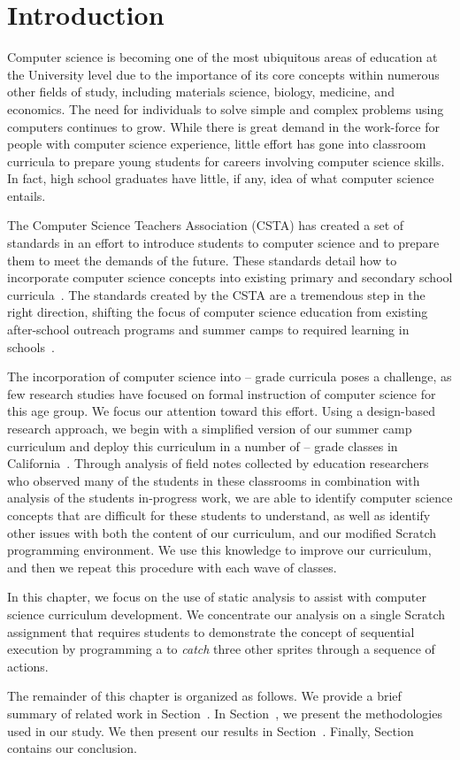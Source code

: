 \section{Introduction}
Computer science is becoming one of the most ubiquitous areas of education at
the University level due to the importance of its core concepts within numerous
other fields of study, including materials science, biology, medicine, and
economics. The need for individuals to solve simple and complex problems using
computers continues to grow. While there is great demand in the work-force for
people with computer science experience, little effort has gone into classroom
curricula to prepare young students for careers involving computer science
skills. In fact, high school graduates have little, if any, idea of what
computer science entails.

The Computer Science Teachers Association (CSTA) has created a set of standards
in an effort to introduce students to computer science and to prepare them to
meet the demands of the future. These standards detail how to incorporate
computer science concepts into existing primary and secondary school
curricula~\cite{cstastandards}. The standards created by the CSTA are a
tremendous step in the right direction, shifting the focus of computer science
education from existing after-school outreach programs and summer camps to
required learning in schools~\cite{wayanoutpost, georgiaoutreach,
  Franklin:2011:ATA:1953163.1953295, Maloney:2010:SPL:1868358.1868363,
  Dann:2000:MCP:343048.343070, Hood:2005:TPL:1067445.1067454, csunplugged}.

The incorporation of computer science into -- grade curricula
poses a challenge, as few research studies have focused on formal instruction
of computer science for this age group. We focus our attention toward this
effort. Using a design-based research approach, we begin with a simplified
version of our summer camp curriculum and deploy this curriculum in a number of
-- grade classes in California~\cite{Franklin:2013:SBO}. Through
analysis of field notes collected by education researchers who observed many of
the students in these classrooms in combination with analysis of the students
in-progress work, we are able to identify computer science concepts that are
difficult for these students to understand, as well as identify other issues
with both the content of our curriculum, and our modified Scratch programming
environment. We use this knowledge to improve our curriculum, and then we
repeat this procedure with each wave of classes.

In this chapter, we focus on the use of static analysis to assist with computer
science curriculum development. We concentrate our analysis on a single Scratch
assignment that requires students to demonstrate the concept of sequential
execution by programming a \net{} to \emph{catch} three other sprites through a
sequence of actions.

The remainder of this chapter is organized as follows. We provide a brief
summary of related work in Section~. In
Section~, we present the methodologies used in our
study. We then present our results in Section~. Finally,
Section~ contains our conclusion.
